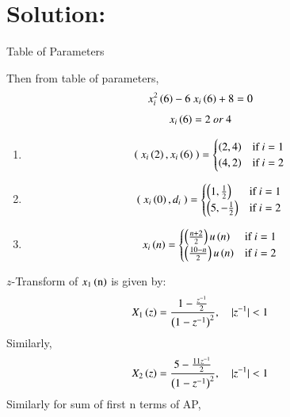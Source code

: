 \documentclass[beamer]{IEEEtran}
\theoremstyle{remark}
\begin{document}
\section*{Solution:}
{
\centering
Table of Parameters\\
}
\begin{table}[h]
    \centering
    
    \label{table of parameters}
\end{table}
Then from table of parameters,
\begin{align}
x_i^2\left(6\right)-6\ x_i\left(6\right)+8&=0
\end{align}
\begin{align}
x_i\left(6\right)&=2\ or\ 4
\end{align}
\begin{enumerate}
 \item \begin{align}
    \left(\ x_i\left(2\right),x_i\left(6\right)\ \right) &=
    \begin{cases}
        \left(2,4\right) & \text{if } i = 1 \\
        \left(4,2\right) & \text{if } i = 2 
    \end{cases}
\end{align}
\item \begin{align}
    \left(\ x_i\left(0\right),d_i\ \right)&=
    \begin{cases}
         \left(1,\frac{1}{2}\right)& \text{if } i=1 \\
         \left(5,-\frac{1}{2}\right) & \text{if } i=2
    \end{cases}
\end{align}
\item \begin{align}
    x_i\left(n\right) &=
    \begin{cases}
        \left(\frac{n+2}{2}\right)u\left(n\right) & \text{if } i=1 \\
        \left(\frac{10-n}{2}\right)u\left(n\right) & \text{if } i=2 
    \end{cases}
\end{align}
\end{enumerate}
$z$-Transform of $x_1\left(\text{n}\right)$ is given by:
\begin{align} X_1\left(z\right)&=\frac{1-\frac{z^{-1}}{2}}{\left(1-z^{-1}\right)^2},\quad |z^{-1}|<1
\end{align}
Similarly,
\begin{align}X_2\left(z\right)&=\frac{5-\frac{11z^{-1}}{2}}{\left(1-z^{-1}\right)^2},\quad |z^{-1}|<1 \end{align}
Similarly for sum of first n terms of AP,
\end{document}
